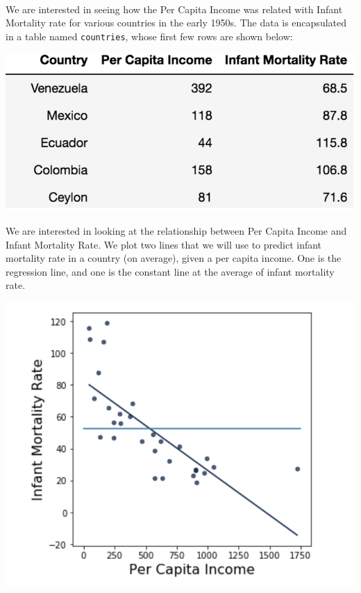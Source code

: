  \\

We are interested in seeing how the Per Capita Income was related with Infant Mortality rate for various countries in the early 1950s. The data is encapsulated in a table named {\tt countries}, whose first few rows are shown below: 

\begin{center}
\includegraphics[scale=0.6]{regtable.png}
\end{center}

We are interested in looking at the relationship between Per Capita Income and Infant Mortality Rate. We plot two lines that we will use to predict infant mortality rate in a country (on average), given a per capita income. One is the regression line, and one is the constant line at the average of infant mortality rate. 

\begin{center}
\includegraphics[scale=0.8]{regavg.png}
\end{center}


